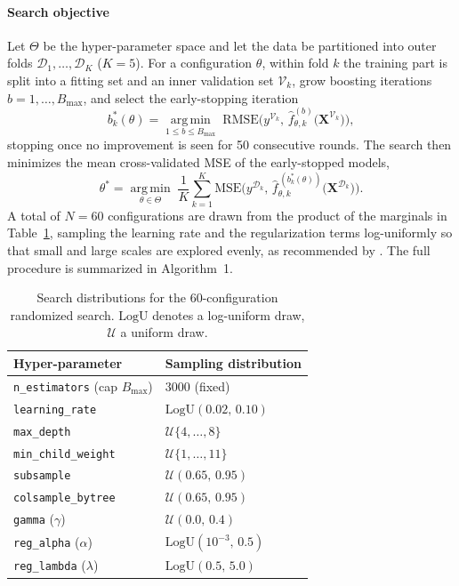 \documentclass[journal]{IEEEtran}
\begin{document}
\paragraph{Search objective} Let $\Theta$ be the hyper-parameter space and let
the data be partitioned into outer folds $\mathcal{D}_1,\dots,\mathcal{D}_K$
($K=5$). For a configuration $\theta$, within fold $k$ the training part is split
into a fitting set and an inner validation set $\mathcal{V}_k$, grow boosting
iterations $b=1,\dots,B_{\max}$, and select the early-stopping iteration
\begin{equation}
b_k^{*}(\theta)=\operatorname*{arg\,min}_{1\le b\le B_{\max}}
\;\mathrm{RMSE}\!\Big(y^{\mathcal{V}_k},\,
\hat f^{(b)}_{\theta,k}\big(\mathbf{X}^{\mathcal{V}_k}\big)\Big),
\label{eq:earlystop}
\end{equation}
stopping once no improvement is seen for 50 consecutive rounds. The search then
minimizes the mean cross-validated MSE of the early-stopped models,
\begin{equation}
\theta^{*}=\operatorname*{arg\,min}_{\theta\in\Theta}\;
\frac{1}{K}\sum_{k=1}^{K}
\mathrm{MSE}\!\Big(y^{\mathcal{D}_k},\,
\hat f^{\,(b_k^{*}(\theta))}_{\theta,k}\big(\mathbf{X}^{\mathcal{D}_k}\big)\Big).
\label{eq:searchobj}
\end{equation}
A total of $N=60$ configurations are drawn from the product of the marginals in
Table~\ref{tab:search}, sampling the learning rate and the regularization terms
log-uniformly so that small and large scales are explored evenly, as recommended
by \cite{bergstra2012random}. The full procedure is summarized in
Algorithm~1.

\begin{table}[!t]
\caption{Search distributions for the 60-configuration randomized search.
$\mathrm{LogU}$ denotes a log-uniform draw, $\mathcal{U}$ a uniform draw.}
\label{tab:search}
\centering
\begin{tabular}{ll}
\toprule
Hyper-parameter & Sampling distribution \\
\midrule
\texttt{n\_estimators} (cap $B_{\max}$) & $3000$ (fixed) \\
\texttt{learning\_rate} & $\mathrm{LogU}(0.02,\,0.10)$ \\
\texttt{max\_depth} & $\mathcal{U}\{4,\dots,8\}$ \\
\texttt{min\_child\_weight} & $\mathcal{U}\{1,\dots,11\}$ \\
\texttt{subsample} & $\mathcal{U}(0.65,\,0.95)$ \\
\texttt{colsample\_bytree} & $\mathcal{U}(0.65,\,0.95)$ \\
\texttt{gamma} ($\gamma$) & $\mathcal{U}(0.0,\,0.4)$ \\
\texttt{reg\_alpha} ($\alpha$) & $\mathrm{LogU}(10^{-3},\,0.5)$ \\
\texttt{reg\_lambda} ($\lambda$) & $\mathrm{LogU}(0.5,\,5.0)$ \\
\bottomrule
\end{tabular}
\end{table}
\end{document}
